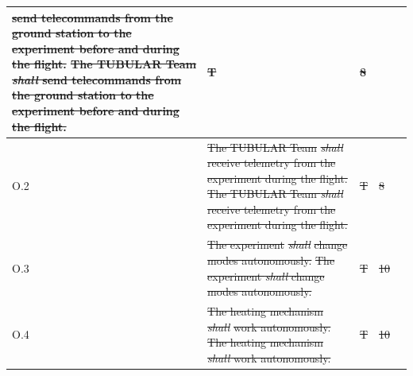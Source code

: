 \documentclass[a4paper,12pt,twoside]{article}
\providecommand{\DIFaddtex}[1]{{\protect\color{blue}\uwave{#1}}} %
\providecommand{\DIFdeltex}[1]{{\protect\color{red}\sout{#1}}}                      %
\providecommand{\DIFaddbegin}{} %
\providecommand{\DIFaddend}{} %
\providecommand{\DIFdelbegin}{} %
\providecommand{\DIFdelend}{} %
\providecommand{\DIFadd}[1]{\texorpdfstring{\DIFaddtex{#1}}{#1}} %
\providecommand{\DIFdel}[1]{\texorpdfstring{\DIFdeltex{#1}}{}} %
\newcommand{\DIFscaledelfig}{0.5}
\newlength{\DIFdelgraphicswidth} %
\newlength{\DIFdelgraphicsheight} %
\newcommand{\DIFaddincludegraphics}[2][]{{\color{blue}\fbox{\DIFOincludegraphics[#1]{#2}}}} %
\newcommand{\DIFdelincludegraphics}[2][]{%
\sbox{\DIFdelgraphicsbox}{\DIFOincludegraphics[#1]{#2}}%
\settoboxwidth{\DIFdelgraphicswidth}{\DIFdelgraphicsbox} %
\settoboxtotalheight{\DIFdelgraphicsheight}{\DIFdelgraphicsbox} %
\scalebox{\DIFscaledelfig}{%
\parbox[b]{\DIFdelgraphicswidth}{\usebox{\DIFdelgraphicsbox}\\[-\baselineskip] \rule{\DIFdelgraphicswidth}{0em}}\llap{\resizebox{\DIFdelgraphicswidth}{\DIFdelgraphicsheight}{%
\setlength{\unitlength}{\DIFdelgraphicswidth}%
\begin{picture}(1,1)%
\thicklines\linethickness{2pt} %
{\color[rgb]{1,0,0}\put(0,0){\framebox(1,1){}}}%
{\color[rgb]{1,0,0}\put(0,0){\line( 1,1){1}}}%
{\color[rgb]{1,0,0}\put(0,1){\line(1,-1){1}}}%
\end{picture}%
}\hspace*{3pt}}} %
} %
\DeclareRobustCommand{\DIFaddbegin}{\DIFOaddbegin \let\includegraphics\DIFaddincludegraphics} %
\DeclareRobustCommand{\DIFaddend}{\DIFOaddend \let\includegraphics\DIFOincludegraphics} %
\DeclareRobustCommand{\DIFdelbegin}{\DIFOdelbegin \let\includegraphics\DIFdelincludegraphics} %
\DeclareRobustCommand{\DIFdelend}{\DIFOaddend \let\includegraphics\DIFOincludegraphics} %
\begin{document}
\begin{longtable}[]{|m{}| m{} |m{} |m{}|m{}|}
\DIFdel{send telecommands from the ground station to the experiment before and during the flight.                                             }\DIFdelend \DIFaddbegin \st{The TUBULAR Team \textit{shall} send telecommands from the ground station to the experiment before and during the flight.}\DIFadd{\textsuperscript{\ref{fn:unnecessary-requirement}}                                             }\DIFaddend &    \DIFdelbegin \DIFdel{T          }\DIFdelend \DIFaddbegin \DIFadd{-  }\DIFaddend & \DIFdelbegin \DIFdel{8            }\DIFdelend \DIFaddbegin \DIFadd{-            }\DIFaddend &        \\ \hline
O.2  & \DIFdelbegin \DIFdel{The TUBULAR Team }\textit{\DIFdel{shall}} %
\DIFdel{receive telemetry from the experiment during the flight.                                                                              }\DIFdelend \DIFaddbegin \st{The TUBULAR Team \textit{shall} receive telemetry from the experiment during the flight.}\DIFadd{\textsuperscript{\ref{fn:unnecessary-requirement}}                                                                              }\DIFaddend &   \DIFdelbegin \DIFdel{T          }\DIFdelend \DIFaddbegin \DIFadd{-      }\DIFaddend & \DIFdelbegin \DIFdel{8            }\DIFdelend \DIFaddbegin \DIFadd{-            }\DIFaddend &        \\ \hline
O.3  & \DIFdelbegin \DIFdel{The experiment }\textit{\DIFdel{shall}} %
\DIFdel{change modes autonomously.                                                                                                              }\DIFdelend \DIFaddbegin \st{The experiment \textit{shall} change modes autonomously.}\DIFadd{\textsuperscript{\ref{fn:unnecessary-requirement}}                                                                                                              }\DIFaddend &        \DIFdelbegin \DIFdel{T      }\DIFdelend \DIFaddbegin \DIFadd{-      }\DIFaddend & \DIFdelbegin \DIFdel{10            }\DIFdelend \DIFaddbegin \DIFadd{-          }\DIFaddend &        \\ \hline
O.4  & \DIFdelbegin \DIFdel{The heating mechanism }\textit{\DIFdel{shall}} %
\DIFdel{work autonomously.                                                                                                               }\DIFdelend \DIFaddbegin \st{The heating mechanism \textit{shall} work autonomously.}\DIFadd{\textsuperscript{\ref{fn:unnecessary-requirement}}                                                                                                               }\DIFaddend &        \DIFdelbegin \DIFdel{T      }\DIFdelend \DIFaddbegin \DIFadd{-      }\DIFaddend & \DIFdelbegin \DIFdel{10            }\DIFdelend \DIFaddbegin \DIFadd{-            }\DIFaddend &        \\ \hline

\end{longtable}
\end{document}
